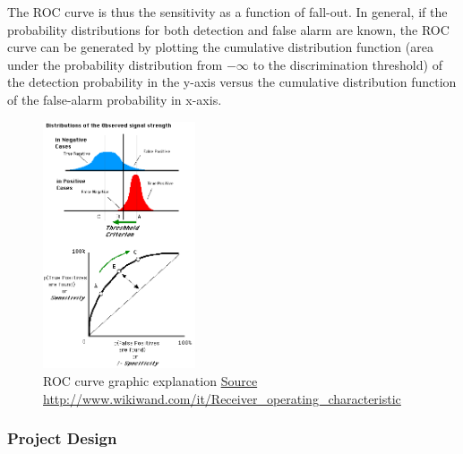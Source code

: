 \documentclass[]{article}
\begin{document}
The ROC curve is thus the sensitivity as a function of fall-out. In general, if the probability distributions for both detection and false alarm are known, the ROC curve can be generated by plotting the cumulative distribution function (area under the probability distribution from $-\infty$  to the discrimination threshold) of the detection probability in the y-axis versus the cumulative distribution function of the false-alarm probability in x-axis.  \cite{wikiROC}

\begin{figure}[htpb!]
\centering
\includegraphics[width= 0.4\textwidth]{images/ROCfig}
\caption{ROC curve graphic explanation \href{http://www.wikiwand.com/it/Receiver_operating_characteristic}{Source http://www.wikiwand.com/it/Receiver\_operating\_characteristic}}
\end{figure}

\subsubsection{Project Design}\label{project-design}

\end{document}
